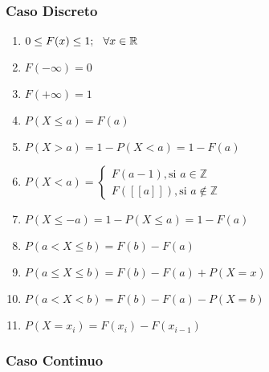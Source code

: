 \subsubsection{Caso Discreto}
\begin{enumerate}
\item $0\leq F(x) \leq 1;\hspace{0.25cm}\forall x\in\mathbb{R}$
\item $F(-\infty)=0$
\item $F(+\infty)=1$
\item $P(X\leq a) = F(a)$
\item $P(X>a)=1-P(X<a)=1-F(a)$
\item $P(X<a)=
\begin{cases}
F(a-1), \text{si } a\in\mathbb{Z} \\
F([\![ a ]\!]), \text{si } a\notin \mathbb{Z}
\end{cases}
$
\item $P(X\leq -a)=1-P(X\leq a)=1-F(a)$
\item $P(a<X\leq b)=F(b)-F(a)$
\item $P(a\leq X \leq b)=F(b)-F(a)+P(X=x)$
\item $P(a<X<b)=F(b)-F(a)-P(X=b)$
\item $P(X=x_i)=F(x_i)-F(x_{i-1})$
\end{enumerate}
\subsubsection{Caso Continuo}
